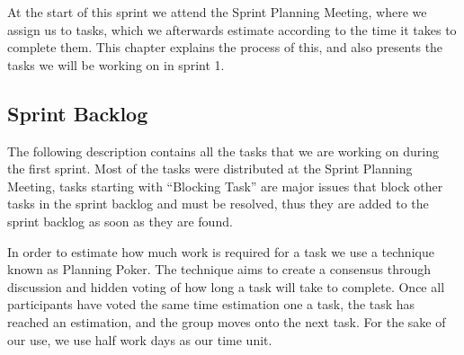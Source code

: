 At the start of this sprint we attend the Sprint Planning Meeting, where we assign us to tasks, which we afterwards estimate according to the time it takes to complete them.
This chapter explains the process of this, and also presents the tasks we will be working on in sprint 1.

\subsection*{Sprint Backlog}
The following description contains all the tasks that we are working on during the first sprint.
Most of the tasks were distributed at the Sprint Planning Meeting, tasks starting with ``Blocking Task'' are major issues that block other tasks in the sprint backlog and must be resolved, thus they are added to the sprint backlog as soon as they are found.

In order to estimate how much work is required for a task we use a technique known as Planning Poker.
The technique aims to create a consensus through discussion and hidden voting of how long a task will take to complete.
Once all participants have voted the same time estimation one a task, the task has reached an estimation, and the group moves onto the next task.
For the sake of our use, we use half work days as our time unit.

